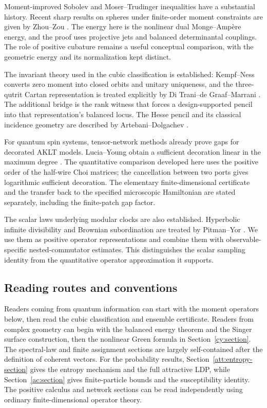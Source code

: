 Moment-improved Sobolev and Moser--Trudinger inequalities have a substantial
history. Recent sharp results on spheres under finite-order moment constraints
are given by Zhou--Zou \citep{ZhouZou2026}. The energy here is the nonlinear
dual Monge--Amp\`ere energy, and the proof uses projective jets and balanced
determinantal couplings. The role of positive cubature remains a useful
conceptual comparison, with the geometric energy and its normalization kept
distinct.

The invariant theory used in the cubic classification is established:
Kempf--Ness converts zero moment into closed orbits and unitary uniqueness,
and the three-qutrit Cartan representation is treated explicitly by
Di Trani--de Graaf--Marrani \citep{geo_ditrani2023}. The additional bridge is
the rank witness that forces a design-supported pencil into that representation's
balanced locus. The Hesse pencil and its classical incidence geometry are
described by Artebani--Dolgachev \citep{geo_hesse2009}.

For quantum spin systems, tensor-network methods already prove gaps for
decorated AKLT models. Lucia--Young obtain a sufficient decoration linear
in the maximum degree \citep{LuciaYoung2023}. The quantitative comparison
developed here uses the positive order of the half-wire Choi matrices;
the cancellation between two ports gives logarithmic sufficient decoration.
The elementary finite-dimensional certificate and the transfer back to the
specified microscopic Hamiltonian are stated separately, including the
finite-patch gap factor.

The scalar laws underlying modular clocks are also established. Hyperbolic
infinite divisibility and Brownian subordination are treated by Pitman--Yor
\citep{PitmanYor2003}. We use them as positive operator representations and
combine them with observable-specific nested-commutator estimates. This
distinguishes the scalar sampling identity from the quantitative operator
approximation it supports.

\subsection{Reading routes and conventions}

Readers coming from quantum information can start with the moment operators
below, then read the cubic classification and ensemble certificate.
Readers from complex geometry can begin with the balanced energy theorem and
the Singer surface construction, then the nonlinear Green formula in
Section~\ref{cy:section}. The spectral-law and finite assignment
sections are largely self-contained after the definition of coherent
vectors. For the probability results, Section~\ref{att:entropy-section}
gives the entropy mechanism and the full attractive LDP, while
Section~\ref{ac:section} gives finite-particle bounds and the susceptibility
identity. The positive
calculus and network sections can be read independently using ordinary
finite-dimensional operator theory.

